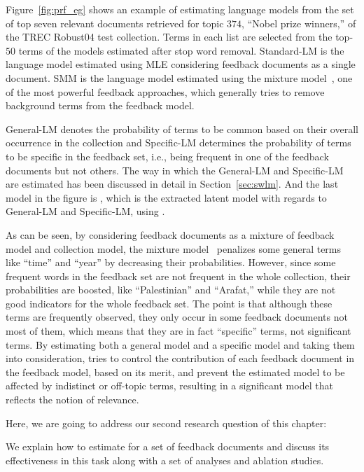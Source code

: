 
Figure~\ref{fig:prf_eg} shows an example of estimating language models from the set of top seven relevant documents retrieved for topic $374$, ``Nobel prize winners,'' of the TREC Robust04 test collection.  
Terms in each list are selected from the top-$50$ terms of the models estimated after stop word removal. 
Standard-LM is the language model estimated using MLE considering feedback documents as a single document. 
SMM is the language model estimated using the mixture model~\citep{Zhai:SMM:2001}, one of the most powerful feedback approaches, which generally tries to remove background terms from the feedback model.

%
General-LM denotes the probability of terms to be common based on their overall occurrence in the collection and Specific-LM determines the probability of terms to be specific in the feedback set, i.e., being frequent in one of the feedback documents but not others. 
The way in which the General-LM and Specific-LM are estimated has been discussed in detail in Section~\ref{sec:swlm}. 
And the last model in the figure is \acswlm, which is the extracted latent model with regards to General-LM and Specific-LM, using \swlms.

As can be seen, by considering feedback documents as a mixture of feedback model and collection model, the mixture model~\citep{Zhai:SMM:2001} penalizes some general terms like ``time'' and ``year'' by decreasing their probabilities. However, since some frequent words in the feedback set are not frequent in the whole collection, their probabilities are boosted, like ``Palestinian'' and ``Arafat,'' while they are not good indicators for the whole feedback set. The point is that although these terms are frequently observed, they only occur in some feedback documents not most of them, which means that they are in fact ``specific'' terms, not significant terms.
By estimating both a general model and a specific model and taking them into consideration, \acswlm tries to control the contribution of each feedback document in the feedback model, based on its merit, and prevent the estimated model to be affected by indistinct or off-topic terms, resulting in a significant model that reflects the notion of relevance.

Here, we are going to address our second research question of this chapter: 

We explain how to estimate \acswlm for a set of feedback documents and discuss its effectiveness in this task along with a set of analyses and ablation studies.

